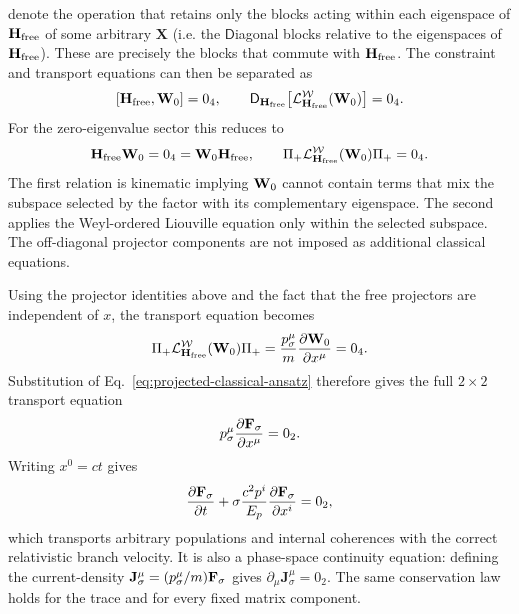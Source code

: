 \documentclass[final,5p,times,twocolumn]{elsarticle}
\begin{document}
denote the operation that retains only the blocks acting within each eigenspace of $\mathbf{H}_{\mathrm{free}}$ of some arbitrary $\mathbf{X}$ (i.e. the $\mathsf{D}$iagonal blocks relative to the eigenspaces of $\mathbf{H}_{\mathrm{free}}$). These are precisely the blocks that commute with $\mathbf{H}_{\mathrm{free}}$. The constraint and transport equations can then be separated as
\begin{equation}
    \left[{\mathbf{H}_{\mathrm{free}}} ,{\mathbf{W}_0}\right]=0_4,
    \qquad
    \mathsf{D}_{\mathbf{H}_{\mathrm{free}}}\!\left[
        \mathcal{L}^{\mathcal{W}}_{\mathbf{H}_{\mathrm{free}}}(\mathbf{W}_0)
    \right]
    =0_4.
    \label{eq:projected-classical-system}
\end{equation}
For the zero-eigenvalue sector this reduces to
\begin{equation}
    \mathbf{H}_{\mathrm{free}}\mathbf{W}_0=0_4=\mathbf{W}_0\mathbf{H}_{\mathrm{free}},
    \qquad
    \Pi_+\mathcal{L}^{\mathcal{W}}_{\mathbf{H}_{\mathrm{free}}}(\mathbf{W}_0)\Pi_+=0_4.
    \label{eq:physical-projected-system}
\end{equation}
The first relation is kinematic implying $\mathbf{W}_0$ cannot contain terms that mix the subspace selected by the factor with its complementary eigenspace. The second applies the Weyl-ordered Liouville equation only within the selected subspace. The off-diagonal projector components are not imposed as additional classical equations.

Using the projector identities above and the fact that the free projectors are independent of $x$, the transport equation becomes
\begin{equation}
    \Pi_+
    \mathcal{L}^{\mathcal{W}}_{\uH_{\mathrm{free}}}(\uW_0)
    \Pi_+
    =
    \frac{p_\sigma^\mu}{m}\PD{\uW_0}{x^\mu}
    =0_4.
    \label{eq:matrix-transport}
\end{equation}
Substitution of Eq.~\eqref{eq:projected-classical-ansatz} therefore gives the full $2\times2$ transport equation
\begin{equation}
    p_\sigma^\mu\PD{\uF_\sigma}{x^\mu}=0_2.
    \label{eq:internal-transport}
\end{equation}
Writing $x^0=ct$ gives
\begin{equation}
    \PD{\uF_\sigma}{t}
    +
    \sigma\frac{c^2p^i}{E_p}\PD{\uF_\sigma}{x^i}
    =0_2,
    \label{eq:coordinate-time-transport}
\end{equation}
which transports arbitrary populations and internal coherences with the correct relativistic branch velocity. It is also a phase-space continuity equation: defining the current-density $\mathbf{J}_\sigma^\mu=(p_\sigma^\mu/m)\mathbf{F}_\sigma$ gives $\partial_\mu\mathbf{J}_\sigma^\mu=0_2$. The same conservation law holds for the trace and for every fixed matrix component.
\end{document}
